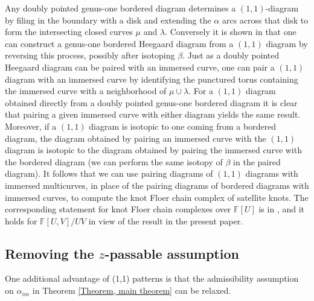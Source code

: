 \documentclass{amsart}
\theoremstyle{definition}
\theoremstyle{remark}
\numberwithin{equation}{section}
\numberwithin{equation}{section} \makeatletter
\begin{document}
Any doubly pointed genus-one bordered diagram determines a $(1,1)$-diagram by filing in the boundary with a disk and extending the $\alpha$ arcs across that disk to form the intersecting closed curves $\mu$ and $\lambda$. Conversely it is shown in \cite[Section 2.4]{Chen2019} that one can construct a genus-one bordered Heegaard diagram from a $(1,1)$ diagram by reversing this process, possibly after isotoping $\beta$. Just as a doubly pointed Heegaard diagram can be paired with an immersed curve, one can pair a $(1,1)$ diagram with an immersed curve by identifying the punctured torus containing the immersed curve with a neighborhood of $\mu \cup \lambda$. For a $(1,1)$ diagram obtained directly from a doubly pointed genus-one bordered diagram it is clear that pairing a given immersed curve with either diagram yields the same result. Moreover, if a $(1,1)$ diagram is isotopic to one coming from a bordered diagram, the diagram obtained by pairing an immersed curve with the $(1,1)$ diagram is isotopic to the diagram obtained by pairing the immersed curve with the bordered diagram (we can perform the same isotopy of $\beta$ in the paired diagram). It follows that we can use pairing diagrams of $(1,1)$ diagrams with immersed multicurves, in place of the pairing diagrams of bordered diagrams with immersed curves, to compute the knot Floer chain complex of satellite knots. The corresponding statement for knot Floer chain complexes over $\mathbb{F}[U]$ is in \cite[Theorem 1.2]{Chen2019}, and it holds for $\mathbb{F}[U,V]/UV$ in view of the result in the present paper.  


\subsection{Removing the $z$-passable assumption}\label{Subsection, 1 1 pattern knots}


One additional advantage of (1,1) patterns is that the admissibility assumption on $\alpha_{im}$ in Theorem \ref{Theorem, main theorem} can be relaxed. 
\end{document}
